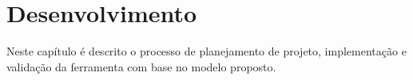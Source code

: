 \chapter{Desenvolvimento}

Neste capítulo é descrito o processo de planejamento de projeto, implementação e validação da ferramenta com base no modelo proposto.




